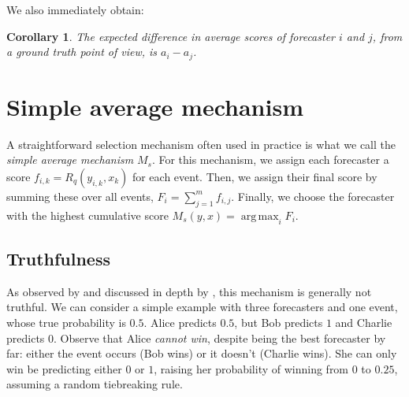 \documentclass[letterpaper,12pt]{article}
\DeclareMathOperator*{\argmax}{arg\,max}
\newcommand{\1}{\mathbbm{1}}
\newtheorem{corollary}[theorem]{Corollary}
\begin{document}
We also immediately obtain:
\begin{corollary} \label{cor:diff-score-accuracy}
  The expected difference in average scores of forecaster $i$ and $j$, from a ground truth point of view, is $a_i - a_j$.
\end{corollary}

\section{Simple average mechanism}
A straightforward selection mechanism often used in practice is what we call the \emph{simple average mechanism} $M_s$. For this mechanism, we assign each forecaster a score $f_{i, k} = R_q(y_{i, k}, x_k)$ for each event. Then, we assign their final score by summing these over all events, $F_i = \sum_{j=1}^m f_{i, j}$. Finally, we choose the forecaster with the highest cumulative score $M_s(y, x) = \argmax_i F_i$.


\subsection{Truthfulness}


As observed by \citet{witkowski2018incentive} and discussed in depth by \citet{lichtendahl2007probability}, this mechanism is generally not truthful. We can consider a simple example with three forecasters and one event, whose true probability is $0.5$.
Alice predicts $0.5$, but Bob predicts $1$ and Charlie predicts $0$.
Observe that Alice \emph{cannot win}, despite being the best forecaster by far: either the event occurs (Bob wins) or it doesn't (Charlie wins).
She can only win be predicting either $0$ or $1$, raising her probability of winning from $0$ to $0.25$, assuming a random tiebreaking rule.
\end{document}
